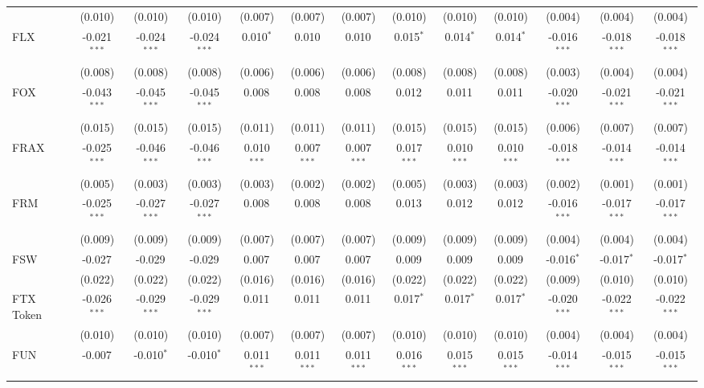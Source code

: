 \begin{table}[!htbp]
\begin{tabular}{@{\extracolsep{5pt}}lcccccccccccc}
  & (0.010) & (0.010) & (0.010) & (0.007) & (0.007) & (0.007) & (0.010) & (0.010) & (0.010) & (0.004) & (0.004) & (0.004) \\
 FLX & -0.021$^{***}$ & -0.024$^{***}$ & -0.024$^{***}$ & 0.010$^{*}$ & 0.010$^{}$ & 0.010$^{}$ & 0.015$^{*}$ & 0.014$^{*}$ & 0.014$^{*}$ & -0.016$^{***}$ & -0.018$^{***}$ & -0.018$^{***}$ \\
  & (0.008) & (0.008) & (0.008) & (0.006) & (0.006) & (0.006) & (0.008) & (0.008) & (0.008) & (0.003) & (0.004) & (0.004) \\
 FOX & -0.043$^{***}$ & -0.045$^{***}$ & -0.045$^{***}$ & 0.008$^{}$ & 0.008$^{}$ & 0.008$^{}$ & 0.012$^{}$ & 0.011$^{}$ & 0.011$^{}$ & -0.020$^{***}$ & -0.021$^{***}$ & -0.021$^{***}$ \\
  & (0.015) & (0.015) & (0.015) & (0.011) & (0.011) & (0.011) & (0.015) & (0.015) & (0.015) & (0.006) & (0.007) & (0.007) \\
 FRAX & -0.025$^{***}$ & -0.046$^{***}$ & -0.046$^{***}$ & 0.010$^{***}$ & 0.007$^{***}$ & 0.007$^{***}$ & 0.017$^{***}$ & 0.010$^{***}$ & 0.010$^{***}$ & -0.018$^{***}$ & -0.014$^{***}$ & -0.014$^{***}$ \\
  & (0.005) & (0.003) & (0.003) & (0.003) & (0.002) & (0.002) & (0.005) & (0.003) & (0.003) & (0.002) & (0.001) & (0.001) \\
 FRM & -0.025$^{***}$ & -0.027$^{***}$ & -0.027$^{***}$ & 0.008$^{}$ & 0.008$^{}$ & 0.008$^{}$ & 0.013$^{}$ & 0.012$^{}$ & 0.012$^{}$ & -0.016$^{***}$ & -0.017$^{***}$ & -0.017$^{***}$ \\
  & (0.009) & (0.009) & (0.009) & (0.007) & (0.007) & (0.007) & (0.009) & (0.009) & (0.009) & (0.004) & (0.004) & (0.004) \\
 FSW & -0.027$^{}$ & -0.029$^{}$ & -0.029$^{}$ & 0.007$^{}$ & 0.007$^{}$ & 0.007$^{}$ & 0.009$^{}$ & 0.009$^{}$ & 0.009$^{}$ & -0.016$^{*}$ & -0.017$^{*}$ & -0.017$^{*}$ \\
  & (0.022) & (0.022) & (0.022) & (0.016) & (0.016) & (0.016) & (0.022) & (0.022) & (0.022) & (0.009) & (0.010) & (0.010) \\
 FTX Token & -0.026$^{***}$ & -0.029$^{***}$ & -0.029$^{***}$ & 0.011$^{}$ & 0.011$^{}$ & 0.011$^{}$ & 0.017$^{*}$ & 0.017$^{*}$ & 0.017$^{*}$ & -0.020$^{***}$ & -0.022$^{***}$ & -0.022$^{***}$ \\
  & (0.010) & (0.010) & (0.010) & (0.007) & (0.007) & (0.007) & (0.010) & (0.010) & (0.010) & (0.004) & (0.004) & (0.004) \\
 FUN & -0.007$^{}$ & -0.010$^{*}$ & -0.010$^{*}$ & 0.011$^{***}$ & 0.011$^{***}$ & 0.011$^{***}$ & 0.016$^{***}$ & 0.015$^{***}$ & 0.015$^{***}$ & -0.014$^{***}$ & -0.015$^{***}$ & -0.015$^{***}$ \\

\end{tabular}
\end{table}
